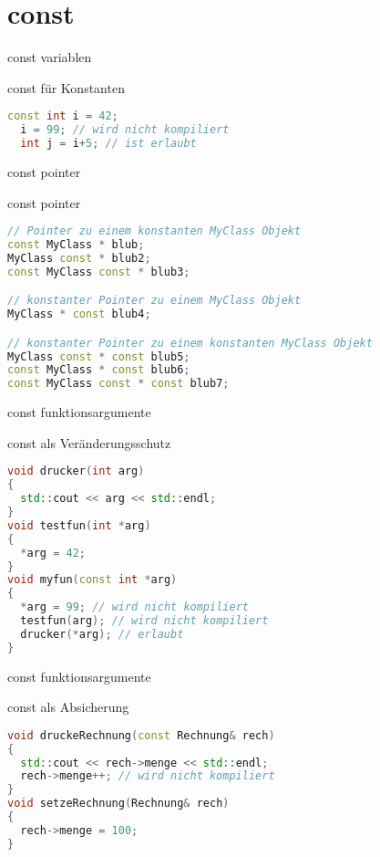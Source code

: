 \section{const}
\begin{frame}[fragile]{const variablen}

\begin{block}{const für Konstanten}
	\begin{lstlisting}[language=C++]
  const int i = 42;
  i = 99; // wird nicht kompiliert
  int j = i+5; // ist erlaubt
	\end{lstlisting}
\end{block}

\end{frame}

\begin{frame}[fragile]{const pointer}

\begin{block}{const pointer}
\begin{small}
	\begin{lstlisting}[language=C++]
// Pointer zu einem konstanten MyClass Objekt
const MyClass * blub;
MyClass const * blub2;
const MyClass const * blub3;

// konstanter Pointer zu einem MyClass Objekt
MyClass * const blub4;

// konstanter Pointer zu einem konstanten MyClass Objekt
MyClass const * const blub5; 
const MyClass * const blub6; 
const MyClass const * const blub7;
	\end{lstlisting}
	\end{small}
\end{block}

\end{frame}

\begin{frame}[fragile]{const funktionsargumente}

\begin{block}{const als Veränderungsschutz}
\begin{small}
	\begin{lstlisting}[language=C++]
void drucker(int arg)
{
  std::cout << arg << std::endl;
}
void testfun(int *arg)
{
  *arg = 42;
}
void myfun(const int *arg)
{
  *arg = 99; // wird nicht kompiliert
  testfun(arg); // wird nicht kompiliert
  drucker(*arg); // erlaubt
}
	\end{lstlisting}
	\end{small}
\end{block}

\end{frame}
\begin{frame}[fragile]{const funktionsargumente}

\begin{block}{const als Absicherung}
	\begin{lstlisting}[language=C++]
void druckeRechnung(const Rechnung& rech)
{
  std::cout << rech->menge << std::endl;
  rech->menge++; // wird nicht kompiliert
}
void setzeRechnung(Rechnung& rech)
{
  rech->menge = 100;
}
	\end{lstlisting}
\end{block}


\end{frame}
